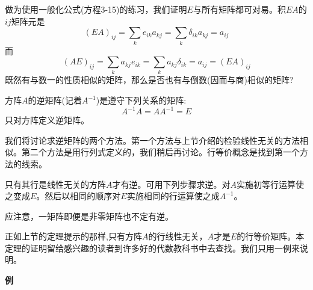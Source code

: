 做为使用一般化公式(方程3-15)的练习，我们证明$E$与所有矩阵都可对易。积$EA$的$ij$矩阵元是
\[(EA)_{ij}=\sum_ke_{ik}a_{kj}=\sum_k\delta_{ik}a_{kj}=a_{ij} \tag{3-19}\]
而
\[(AE)_{ij}=\sum_ka_{kj}e_{ik}=\sum_ka_{kj}\delta_{ik}=a_{ij}=(EA)_{ij} \tag{3-19}\]
既然有与数一的性质相似的矩阵，那么是否也有与倒数(因而与商)相似的矩阵?

\begin{definition}[逆矩阵]
    方阵$A$的逆矩阵(记着$A^{-1}$)是遵守下列关系的矩阵:
    \[A^{-1}A=AA^{-1}=E\]
    只对方阵定义逆矩阵。
\end{definition}

我们将讨论求逆矩阵的两个方法。第一个方法与上节介绍的检验线性无关的方法相似。第二个方法是用行列式定义的，我们稍后再讨论。行等价概念是找到第一个方法的线索。

\begin{theorem}[矩阵求逆]
    只有其行是线性无关的方阵$A$才有逆。可用下列步骤求逆。对$A$实施初等行运算使之变成$E$。然后以相同的顺序对$E$实施相同的行运算使之成$A^{-1}$。
\end{theorem}

应注意，一矩阵即便是非零矩阵也不定有逆。

正如上节的定理提示的那样,只有方阵$A$的行线性无关，$A$才是$E$的行等价矩阵。本定理的证明留给感兴趣的读者到许多好的代数教科书中去查找。我们只用一例来说明。

\textbf{例}

